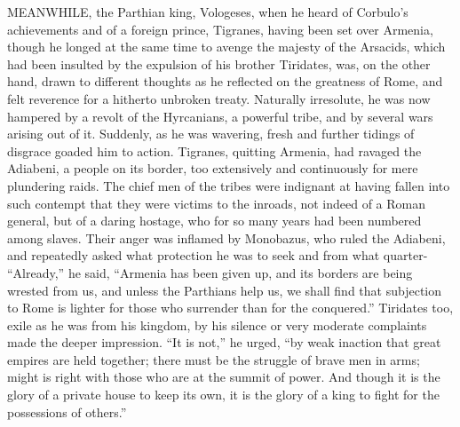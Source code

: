 MEANWHILE, the Parthian king, Vologeses, when he heard of Corbulo's achievements and of a foreign prince, Tigranes, having been set over Armenia, though he longed at the same time to avenge the majesty of the Arsacids, which had been insulted by the expulsion of his brother Tiridates, was, on the other hand, drawn to different thoughts as he reflected on the greatness of Rome, and felt reverence for a hitherto unbroken treaty. Naturally irresolute, he was now hampered by a revolt of the Hyrcanians, a powerful tribe, and by several wars arising out of it. Suddenly, as he was wavering, fresh and further tidings of disgrace goaded him to action. Tigranes, quitting Armenia, had ravaged the Adiabeni, a people on its border, too extensively and continuously for mere plundering raids. The chief men of the tribes were indignant at having fallen into such contempt that they were victims to the inroads, not indeed of a Roman general, but of a daring hostage, who for so many years had been numbered among slaves. Their anger was inflamed by Monobazus, who ruled the Adiabeni, and repeatedly asked what protection he was to seek and from what quarter- ``Already,'' he said, ``Armenia has been given up, and its borders are being wrested from us, and unless the Parthians help us, we shall find that subjection to Rome is lighter for those who surrender than for the conquered.'' Tiridates too, exile as he was from his kingdom, by his silence or very moderate complaints made the deeper impression. ``It is not,'' he urged, ``by weak inaction that great empires are held together; there must be the struggle of brave men in arms; might is right with those who are at the summit of power. And though it is the glory of a private house to keep its own, it is the glory of a king to fight for the possessions of others.''


